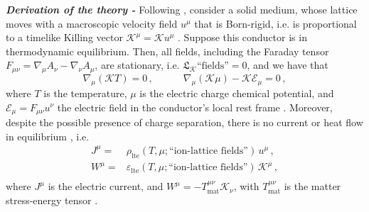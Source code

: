 \documentclass[a4paper, amsfonts, amssymb, amsmath, reprint, showkeys, nofootinbib, twoside,notitlepage]{revtex4-1}
\newcommand{\spc}{\quad \quad \quad}
\newcommand{\K}{{\mathcal{K}}}
\theoremstyle{definition}
\theoremstyle{theorem}
\begin{document}
\noindent\textit{\bf Derivation of the theory -} Following \cite{Anandan1984}, consider a solid medium, whose lattice moves with a macroscopic velocity field $u^\mu$ that is Born-rigid, i.e. is proportional to a timelike Killing vector $\K^\mu=\K u^\mu$ \cite{Born1909,Herglotz1910,Noether1910}. Suppose this conductor is in thermodynamic equilibrium. Then, all fields, including the Faraday tensor $F_{\mu\nu}=\nabla_\mu A_\nu-\nabla_\nu A_\mu$, are stationary, i.e. $\mathfrak{L}_\K \text{``fields''}=0$, and we have that \cite{Hernandez:2017mch}
\vspace{-0.1cm}
\begin{equation}\label{gringoo}
\nabla_\mu (\K T)=0 \, , \spc \nabla_\mu (\K\mu)-\K\mathcal{E}_\mu=0\, , 
\end{equation}
where $T$ is the temperature, $\mu$ is the electric charge chemical potential, and $\mathcal{E}_\mu{=}F_{\mu \nu}u^\nu$ the electric field in the conductor's local rest frame \cite[\S 17.2.3]{special_in_gen}. Moreover, despite the possible presence of charge separation, there is no current or heat flow in equilibrium \cite{GavassinoShokryMHD:2023qnw,Gavassino:2025wcy}, i.e.
\vspace{-0.1cm}
\begin{equation}
\begin{split}
J^\mu ={}& \rho_{\text{lte}}(T,\mu;\text{``ion-lattice fields''})\, u^\mu\, , \\
W^\mu ={}&   \varepsilon_{\text{lte}}(T,\mu;\text{``ion-lattice fields''})\, \K^\mu \, ,\\
\end{split}
\end{equation}
where $J^\mu$ is the electric current, and $W^\mu =-T_\text{mat}^{\mu \nu}\K_\nu$, with $T_\text{mat}^{\mu \nu}$ is the matter stress-energy tensor \cite{GavassinoAntonelli:2025umq}.

\end{document}
